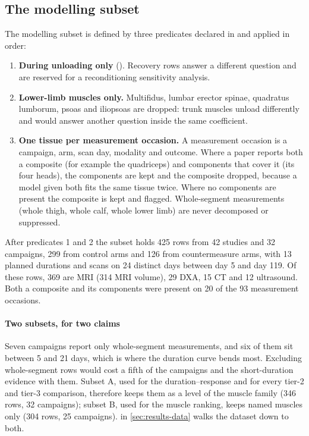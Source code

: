 \subsection{The modelling subset}
\label{sec:subset}

The modelling subset is defined by three predicates declared in  and applied in order:

\begin{enumerate}
  \item \textbf{During unloading only} (). Recovery rows answer a different question and
        are reserved for a reconditioning sensitivity analysis.
  \item \textbf{Lower-limb muscles only.} Multifidus, lumbar erector spinae, quadratus lumborum, psoas and
        iliopsoas are dropped: trunk muscles unload differently and would answer another question inside the same
        coefficient.
  \item \textbf{One tissue per measurement occasion.} A measurement occasion is a campaign, arm, scan day,
        modality and outcome. Where a paper reports both a composite (for example the quadriceps) and components
        that cover it (its four heads), the components are kept and the composite dropped, because a model given
        both fits the same tissue twice. Where no components are present the composite is kept and flagged.
        Whole-segment measurements (whole thigh, whole calf, whole lower limb) are never decomposed or suppressed.
\end{enumerate}

After predicates 1 and 2 the subset holds 425 rows from 42 studies and 32 campaigns, 299 from control arms and 126
from countermeasure arms, with 13 planned durations and scans on 24 distinct days between day 5 and day 119. Of
these rows, 369 are MRI (314 MRI volume), 29 DXA, 15 CT and 12 ultrasound. Both a composite and its components were
present on 20 of the 93 measurement occasions.

\paragraph{Two subsets, for two claims} Seven campaigns report only whole-segment measurements, and six of them
sit between 5 and 21 days, which is where the duration curve bends most. Excluding whole-segment rows would cost a
fifth of the campaigns and the short-duration evidence with them. Subset A, used for the duration--response and for
every tier-2 and tier-3 comparison, therefore keeps them as a  level of the muscle family (346
rows, 32 campaigns); subset B, used for the muscle ranking, keeps named muscles only (304 rows, 25 campaigns).
 in \cref{sec:results-data} walks the dataset down to both.

